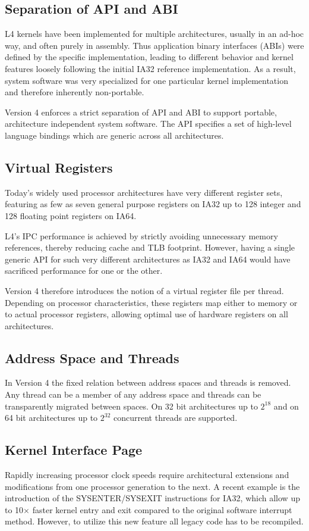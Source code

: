\documentclass[twoside]{whitepaper}
\begin{document}
\subsection{Separation of API and ABI}
L4 kernels have been implemented for multiple architectures,
usually in an ad-hoc way, and often purely in assembly.  Thus
application binary interfaces (ABIs) were defined by the specific
implementation, leading to different behavior and kernel features
loosely following the initial IA32 reference implementation.  
As a result, system software was very specialized for one particular
kernel implementation and therefore inherently non-portable.

Version 4 enforces a strict separation of API and ABI to support
portable, architecture independent system software.  The API specifies
a set of high-level language bindings which are generic across
all architectures.

\subsection{Virtual Registers}
Today's widely used processor architectures have very different
register sets, featuring as few as seven general purpose registers on
IA32 up to 128 integer and 128 floating point registers on IA64.  

L4's IPC performance is achieved by strictly avoiding unnecessary
memory references, thereby reducing cache and TLB footprint.  However,
having a single generic API for such very different architectures as
IA32 and IA64 would have sacrificed performance for one or the other.

Version 4 therefore introduces the notion of a virtual register file per thread.
Depending on processor characteristics, these registers map either to
memory or to actual processor registers, allowing optimal use of hardware
registers on all architectures.

\subsection{Address Space and Threads}
In Version 4 the fixed relation between address spaces and threads is
removed.  Any thread can be a member of any address space and threads
can be transparently migrated between spaces.  On 32 bit architectures
up to $2^{18}$ and on 64 bit architectures up to $2^{32}$ concurrent threads
are supported.

\subsection{Kernel Interface Page}
Rapidly increasing processor clock speeds require architectural
extensions and modifications from one processor generation to the
next.  A recent example is the introduction of the SYSENTER/SYSEXIT instructions for IA32,
which allow up to 10$\times$ faster kernel entry and exit compared to
the original software interrupt method.  However, to utilize this new
feature all legacy code has to be recompiled.
\end{document}
